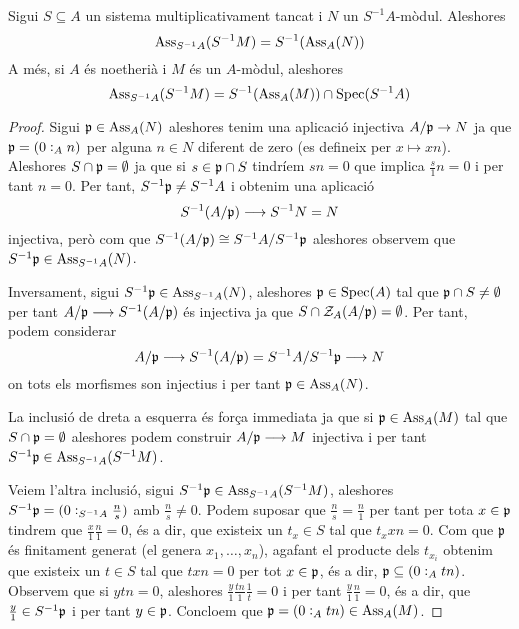 \documentclass[../../../main.tex]{subfiles}
\begin{document}
\begin{prop}
\label{prop:associatsSistemaMultiplicativamentTancat} Sigui $S\subseteq A$ un sistema multiplicativament tancat i $N$ un $S^{-1}A$-mòdul. Aleshores
\begin{equation}
    \notag
    \operatorname{Ass}_{S^{-1}A}(S^{-1}M) = S^{-1}(\operatorname{Ass}_A(N))
\end{equation}
A més, si $A$ és noetherià i $M$ és un $A$-mòdul, aleshores
\begin{equation}
    \notag
    \operatorname{Ass}_{S^{-1}A}(S^{-1}M) = S^{-1}(\operatorname{Ass}_A(M))\cap\mathrm{Spec}(S^{-1}A)
\end{equation}
\end{prop}
\begin{proof}
Sigui $\mathfrak{p}\in\operatorname{Ass}_A(N)$ aleshores tenim una aplicació injectiva $A/\mathfrak{p}\to N$ ja que $\mathfrak{p} = (0:_An)$ per alguna $n\in N$ diferent de zero (es defineix per $x\mapsto xn$). Aleshores $S\cap\mathfrak{p} = \emptyset$ ja que si $s\in\mathfrak{p}\cap S$ tindríem $sn = 0$ que implica $\frac{s}{1}n = 0$ i per tant $n = 0$. Per tant, $S^{-1}\mathfrak{p}\not=S^{-1}A$ i obtenim una aplicació
\begin{equation}
    \notag
    S^{-1}(A/\mathfrak{p})\longrightarrow S^{-1}N=N
\end{equation}
injectiva, però com que $S^{-1}(A/\mathfrak{p})\cong S^{-1}A/S^{-1}\mathfrak{p}$ aleshores observem que $S^{-1}\mathfrak{p}\in\operatorname{Ass}_{S^{-1}A}(N)$.

Inversament, sigui $S^{-1}\mathfrak{p}\in \operatorname{Ass}_{S^{-1}A}(N)$, aleshores $\mathfrak{p}\in\mathrm{Spec}(A)$ tal que $\mathfrak{p}\cap S\not=\emptyset$ per tant $A/\mathfrak{p}\longrightarrow S^{-1}(A/\mathfrak{p})$ és injectiva ja que $S\cap\mathcal{Z}_A(A/\mathfrak{p}) = \emptyset$. Per tant, podem considerar
\begin{equation}
    \notag
    A/\mathfrak{p}\longrightarrow S^{-1}(A/\mathfrak{p}) = S^{-1}A/S^{-1}\mathfrak{p}\longrightarrow N
\end{equation}
on tots els morfismes son injectius i per tant $\mathfrak{p}\in\operatorname{Ass}_A(N)$.

La inclusió de dreta a esquerra és força immediata ja que si $\mathfrak{p}\in\operatorname{Ass}_A(M)$ tal que $S\cap \mathfrak{p} = \emptyset$ aleshores podem construir $A/\mathfrak{p}\longrightarrow M$ injectiva i per tant $S^{-1}\mathfrak{p}\in\operatorname{Ass}_{S^{-1}A}(S^{-1}M)$. 

Veiem l'altra inclusió, sigui $S^{-1}\mathfrak{p}\in\operatorname{Ass}_{S^{-1}A}(S^{-1}M)$, aleshores $S^{-1}\mathfrak{p} = (0:_{S^{-1}A}\frac{n}{s})$ amb $\frac{n}{s}\not=0$. Podem suposar que $\frac{n}{s} = \frac{n}{1}$ per tant per tota $x\in \mathfrak{p}$ tindrem que $\frac{x}{1}\frac{n}{1} = 0$, és a dir, que existeix un $t_x\in S$ tal que $t_xxn = 0$. Com que $\mathfrak{p}$ és finitament generat (el genera $x_1,\ldots,x_n$), agafant el producte dels $t_{x_i}$ obtenim que existeix un $t\in S$ tal que $txn=0$ per tot $x\in\mathfrak{p}$, és a dir, $\mathfrak{p}\subseteq(0:_Atn)$. Observem que si $ytn = 0$, aleshores $\frac{y}{1}\frac{tn}{1}\frac{1}{t}=0$ i per tant $\frac{y}{1}\frac{n}{1}=0$, és a dir, que $\frac{y}{1}\in S^{-1}\mathfrak{p}$ i per tant $y\in\mathfrak{p}$. Concloem que $\mathfrak{p} = (0:_Atn)\in\operatorname{Ass}_A(M)$.
\end{proof}
\end{document}
